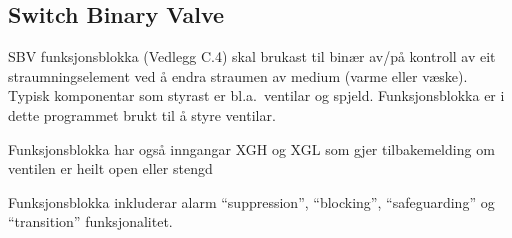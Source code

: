 \newpage

\subsection{Switch Binary Valve}

\gls{SBV} funksjonsblokka (Vedlegg C.4) skal brukast til binær av/på kontroll av eit straumningselement ved å endra straumen av medium (varme eller væske). 
Typisk komponentar som styrast er bl.a.\ ventilar og spjeld.
Funksjonsblokka er i dette programmet brukt til å styre ventilar.


Funksjonsblokka har også inngangar \gls{XGH} og \gls{XGL} som gjer tilbakemelding om ventilen er heilt open eller stengd

Funksjonsblokka inkluderar alarm ``suppression'', ``blocking'', ``safeguarding'' og ``transition'' funksjonalitet.

